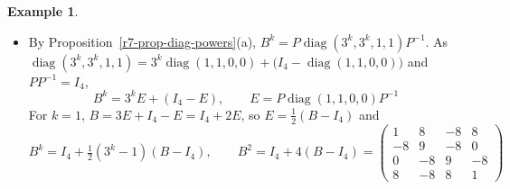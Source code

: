 \documentclass[12pt]{article}
\DeclareMathOperator{\diag}{diag}
\theoremstyle{definition}
\newtheorem{example}[theorem]{Example}
\begin{document}
\begin{example}
\begin{itemize}
\[\]
Check: \(P^{-1}P=I_4\), so this is the inverse (Theorem~\ref{r2-thm-invertible}); for instance, row \(1\) of \(P^{-1}\)
times \(p_4\) is \(0+1+0-1=0\). The eigenvalues of \(B\), listed with multiplicity, are \(3\), \(3\), \(1\), \(1\)
(Definition~\ref{r7-def-diagonalizable}), so \(a_B(3)=g_B(3)=2\) and \(a_B(1)=g_B(1)=2\).
\item By Proposition~\ref{r7-prop-diag-powers}(a), \(B^k=P\diag(3^k,3^k,1,1)P^{-1}\). As
\(\diag(3^k,3^k,1,1)=3^k\diag(1,1,0,0)+\bigl(I_4-\diag(1,1,0,0)\bigr)\) and \(PP^{-1}=I_4\),
\[
B^k=3^kE+(I_4-E),\qquad E=P\diag(1,1,0,0)P^{-1}
\]
For \(k=1\), \(B=3E+I_4-E=I_4+2E\), so \(E=\frac12(B-I_4)\) and
\[
B^k=I_4+\tfrac12(3^k-1)(B-I_4),\qquad
B^2=I_4+4(B-I_4)=\begin{pmatrix}1&8&-8&8\\-8&9&-8&0\\0&-8&9&-8\\8&-8&8&1\end{pmatrix}
\]
\end{itemize}
\end{example}
\end{document}
